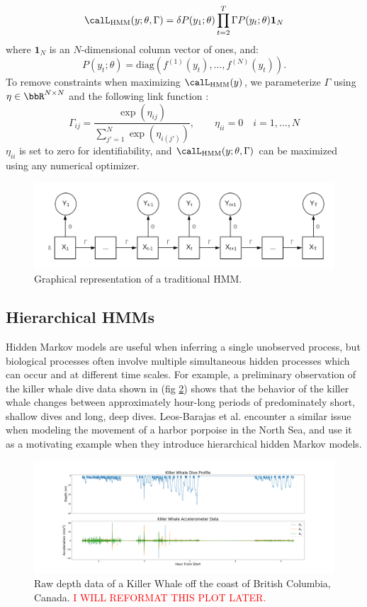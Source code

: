 %
$$\calL_{\text{HMM}}(y;\theta,\Gamma) = \delta P(y_1;\theta) \prod_{t=2}^T \Gamma P(y_t;\theta) \mathbf{1}_N$$
%
where $\mathbf{1}_N$ is an $N$-dimensional column vector of ones, and:
%
$$P(y_t;\theta) = \text{diag}(f^{(1)}(y_t),\ldots , f^{(N)}(y_t)).$$
%
To remove constraints when maximizing $\calL_{\text{HMM}}(y)$, we parameterize $\Gamma$ using $\eta \in \bbR^{N \times N}$ and the following link function \citep{Barajas:2017}:
%
$$\Gamma_{ij} = \frac{\exp(\eta_{ij})}{\sum_{j'=1}^N \exp(\eta_{i(j')})}, \qquad \eta_{ii} = 0 \quad i = 1, \ldots, N$$
%
$\eta_{ii}$ is set to zero for identifiability, and $\calL_{\text{HMM}}(y;\theta,\Gamma)$ can be maximized using any numerical optimizer.

\begin{figure}[h!]
	\centering
	\includegraphics[width=5in]{../Plots/HMM.png}
	\caption{Graphical representation of a traditional HMM.}
	\label{fig:HMM}
\end{figure}

\subsection{Hierarchical HMMs}

Hidden Markov models are useful when inferring a single unobserved process, but biological processes often involve multiple simultaneous hidden processes which can occur and at different time scales. For example, a preliminary observation of the killer whale dive data shown in (fig \ref{fig:data}) shows that the behavior of the killer whale changes between approximately hour-long periods of predominately short, shallow dives and long, deep dives. Leos-Barajas et al. \citep{Barajas:2017} encounter a similar issue when modeling the movement of a harbor porpoise in the North Sea, and use it as a motivating example when they introduce hierarchical hidden Markov models.

\begin{figure}[h!]
	\centering
	\includegraphics[width=5.5in]{../Plots/raw_data.png}
	\caption{Raw depth data of a Killer Whale off the coast of British Columbia, Canada. \textcolor{red}{I WILL REFORMAT THIS PLOT LATER.}}
	\label{fig:data}
\end{figure}

